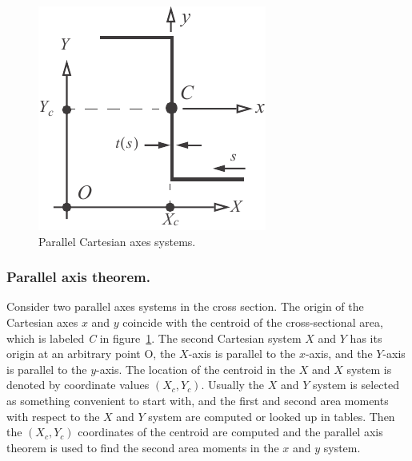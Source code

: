 \documentclass{AeroStructure-ERJohnson}
\begin{document}
\begin{figure}
\vspace{-19pt}
\includegraphics{Figure_4-15.pdf}
\caption{Parallel Cartesian axes systems.\label{fig4.15}}
\end{figure}
\subsubsection{Parallel axis theorem.} Consider two parallel axes systems in the cross section. The origin of the Cartesian axes $x$ and $y$ coincide with the centroid of the cross-sectional area, which is labeled \textit{C} in figure~\ref{fig4.15}. The second Cartesian system $X$ and $Y$ has its origin at an arbitrary point O, the $X$-axis is parallel to the $x$-axis, and the $Y$-axis is parallel to the $y$-axis. The location of the centroid in the $X$ and $X$ system is denoted by coordinate values $\left(X_{c}, Y_{c}\right)$. Usually the $X$ and $Y$ system is selected as something convenient to start with, and the first and second area moments with respect to the $X$ and $Y$ system are computed or looked up in tables. Then the $\left(X_{c}, Y_{c}\right)$ coordinates of the centroid are computed and the parallel axis theorem is used to find the second area moments in the $x$ and $y$ system.
\end{document}
